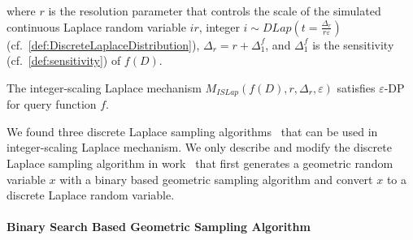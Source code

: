 where $r$ is the resolution parameter that controls the scale of the simulated continuous Laplace random variable $ir$, integer $i \sim DLap\left(t=\frac{\Delta_r}{r\varepsilon}\right) $ (cf.~\autoref{def:DiscreteLaplaceDistribution}), $\Delta _r=r+\Delta^f_1$, and $\Delta^f_1$ is the sensitivity (cf.~\autoref{def:sensitivity}) of $f\left(D\right)$.

\begin{theorem}
    The integer-scaling Laplace mechanism $M_{ISLap}\left(f\left(D\right),r,\Delta _r,\varepsilon\right)$ satisfies $\varepsilon$-DP for query function $f$.
\end{theorem}

We found three discrete Laplace sampling algorithms~\cite{eigner2014differentially,googleDP2019,canonne2020discrete } that can be used in integer-scaling Laplace mechanism.
We only describe and modify the discrete Laplace sampling algorithm in work~\cite{googleDP2019} that first generates a geometric random variable $x$ with a binary based geometric sampling algorithm and convert $x$ to a discrete Laplace random variable.






\paragraph{Binary Search Based Geometric Sampling Algorithm}
\label{para:BinarySearchBasedGeometricSamplingAlgorithm}

